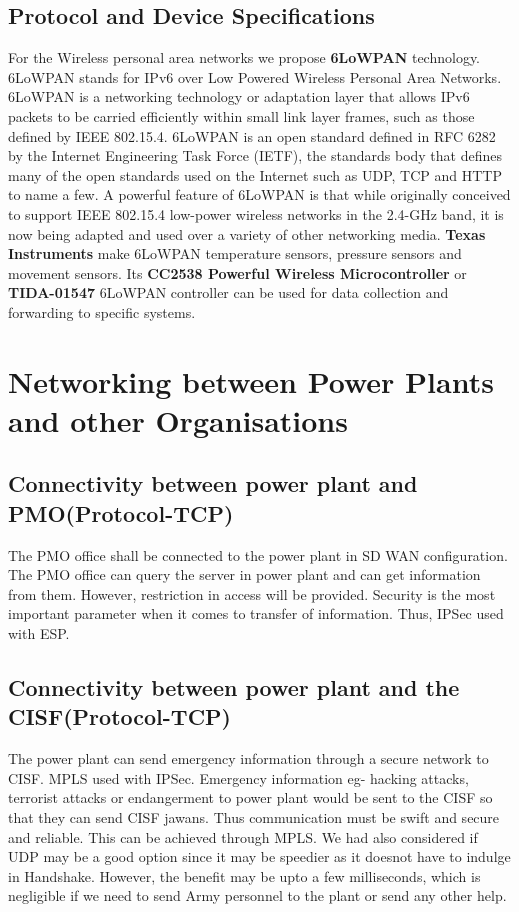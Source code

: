 \documentclass{article}
\begin{document}
\subsection{Protocol and Device Specifications}
For the Wireless personal area networks we propose \textbf{6LoWPAN} technology. 6LoWPAN stands for IPv6 over Low Powered Wireless Personal Area Networks. 6LoWPAN is a networking technology or adaptation layer that allows IPv6 packets to be carried efficiently within small link layer frames, such as those defined by IEEE 802.15.4. 6LoWPAN is an open standard defined in RFC 6282 by the Internet Engineering Task Force (IETF), the standards body that defines many of the open standards used on the Internet such as UDP, TCP and HTTP to name a few. A powerful feature of 6LoWPAN is that while originally conceived to support IEEE 802.15.4 low-power wireless networks in the 2.4-GHz band, it is now being adapted and used over a variety of other networking media. \textbf{Texas Instruments} make 6LoWPAN temperature sensors, pressure sensors and movement sensors. Its \textbf{CC2538 Powerful Wireless Microcontroller} or \textbf{TIDA-01547} 6LoWPAN controller can be used for data collection and forwarding to specific systems.

\section{Networking between Power Plants and other Organisations}

\subsection{Connectivity between power plant and PMO(Protocol-TCP)}
The PMO office shall be connected to the power plant in SD WAN configuration. The PMO office can query the server in power plant and can get information from them. However, restriction in access will be provided. Security is the most important parameter when it comes to transfer of information. Thus, IPSec used with ESP.




\subsection{Connectivity between power plant and the CISF(Protocol-TCP)}
The power plant can send emergency information through a secure network to CISF. MPLS used with IPSec. Emergency information eg- hacking attacks, terrorist attacks or endangerment to power plant would be sent to the CISF so that they can send CISF jawans. Thus communication must be swift and secure and reliable. This can be achieved through MPLS. We had also considered if UDP may be a good option since it may be speedier as it doesnot have to indulge in Handshake. However, the benefit may be upto a few milliseconds, which is negligible if we need to send Army personnel to the plant or send any other help.
\end{document}
